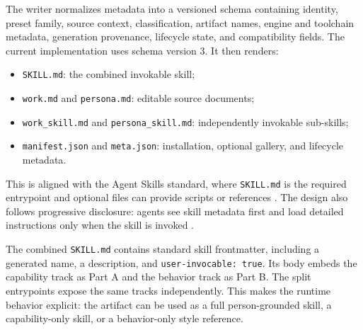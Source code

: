 \documentclass{llmxive}
\begin{document}
The writer normalizes metadata into a versioned schema containing identity, preset family, source context, classification, artifact names, engine and toolchain metadata, generation provenance, lifecycle state, and compatibility fields. The current implementation uses schema version 3. It then renders:
\begin{itemize}
  \item \texttt{SKILL.md}: the combined invokable skill;
  \item \texttt{work.md} and \texttt{persona.md}: editable source documents;
  \item \texttt{work\_skill.md} and \texttt{persona\_skill.md}: independently invokable sub-skills;
  \item \texttt{manifest.json} and \texttt{meta.json}: installation, optional gallery, and lifecycle metadata.
\end{itemize}

This is aligned with the Agent Skills standard, where \texttt{SKILL.md} is the required entrypoint and optional files can provide scripts or references \citep{agentskillsspec2026}. The design also follows progressive disclosure: agents see skill metadata first and load detailed instructions only when the skill is invoked \citep{agentskills2026,claudeskills2026}.

The combined \texttt{SKILL.md} contains standard skill frontmatter, including a generated name, a description, and \texttt{user-invocable: true}. Its body embeds the capability track as Part A and the behavior track as Part B. The split entrypoints expose the same tracks independently. This makes the runtime behavior explicit: the artifact can be used as a full person-grounded skill, a capability-only skill, or a behavior-only style reference.
\end{document}
